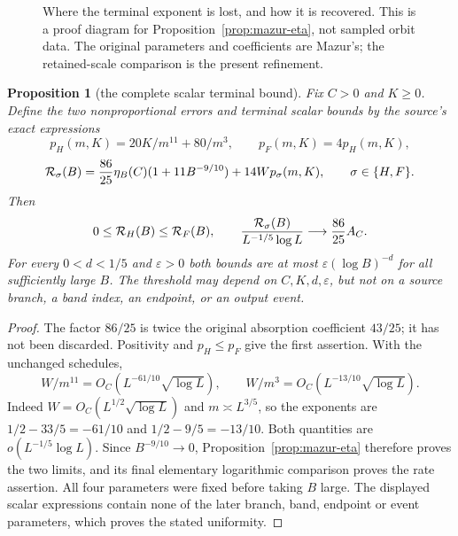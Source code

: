 \documentclass[11pt]{article}
\newtheorem{proposition}{Proposition}
\theoremstyle{remark}\newtheorem{remark}[proposition]{Remark}
\begin{document}
\begin{figure}[ht]
\centering
{}
\caption{Where the terminal exponent is lost, and how it is recovered.
This is a proof diagram for Proposition~\ref{prop:mazur-eta},
not sampled orbit data. The original parameters and coefficients are
Mazur's; the retained-scale comparison is the present refinement.}
\label{fig:mazur-scales}
\end{figure}

\begin{proposition}[the complete scalar terminal bound]
\label{prop:mazur-terminal-rate}
Fix $C>0$ and $K\ge0$. Define the two nonproportional errors
and terminal scalar bounds by the source's exact expressions
\[
 p_H(m,K)=20K/m^{11}+80/m^3,\qquad p_F(m,K)=4p_H(m,K),
\]
\[
 {\cal R}_\sigma(B)=\frac{86}{25}\eta_B(C)
                  (1+11B^{-9/10})+14W p_\sigma(m,K),
 \qquad \sigma\in\{H,F\}.
\]
Then
\[
 0\le{\cal R}_H(B)\le{\cal R}_F(B),\qquad
 \frac{{\cal R}_\sigma(B)}{L^{-1/5}\log L}
       \longrightarrow\frac{86}{25}A_C .
\]
For every $0<d<1/5$ and $\varepsilon>0$ both bounds are
at most $\varepsilon(\log B)^{-d}$ for all sufficiently large
$B$. The threshold may depend on $C,K,d,\varepsilon$, but not
on a source branch, a band index, an endpoint, or an output event.
\end{proposition}
\begin{proof}
The factor $86/25$ is twice the original absorption coefficient
$43/25$; it has not been discarded. Positivity and $p_H\le p_F$
give the first assertion. With the unchanged schedules,
\[
 W/m^{11}=O_C(L^{-61/10}\sqrt{\log L}),\qquad
 W/m^3=O_C(L^{-13/10}\sqrt{\log L}).
\]
Indeed $W=O_C(L^{1/2}\sqrt{\log L})$ and
$m\asymp L^{3/5}$, so the exponents are
$1/2-33/5=-61/10$ and $1/2-9/5=-13/10$.
Both quantities are $o(L^{-1/5}\log L)$.
Since $B^{-9/10}\to0$, Proposition~\ref{prop:mazur-eta}
therefore proves the two limits, and its final elementary
logarithmic comparison proves the rate assertion.
All four parameters were fixed before taking $B$ large.
The displayed scalar expressions contain none of the later
branch, band, endpoint or event parameters, which proves
the stated uniformity.
\end{proof}
\end{document}
